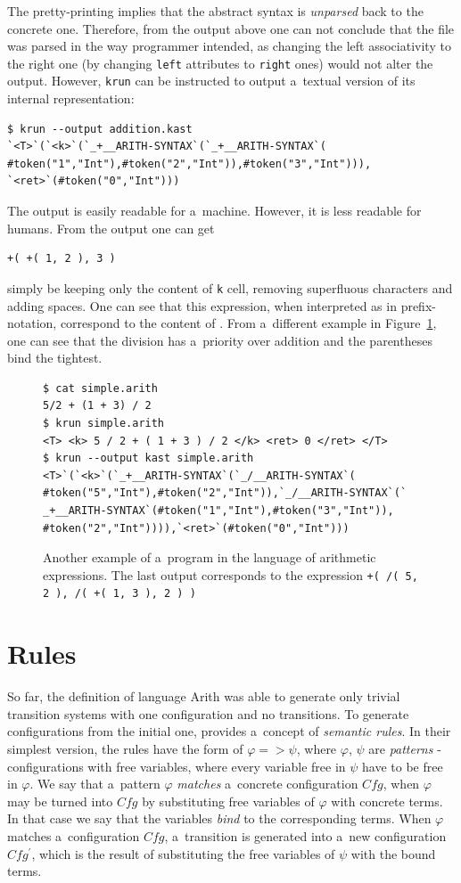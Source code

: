 \documentclass[nolot,nolof,nocover,printed]{fithesis3}
\newcommand{\var}[1]{\mathit{#1}\xspace}
\newcommand{\krun}{\texttt{krun}\xspace}
\begin{document}
The pretty-printing implies that the abstract syntax is \textit{unparsed} back to the concrete one. Therefore, from the output above one can not conclude that the file was parsed in the way programmer intended, as changing the left associativity to the right one (by changing \lstinline|left| attributes to \lstinline|right| ones) would not alter the output. However, \krun can be instructed to output a~textual version of its internal representation:
\begin{lstlisting}
$ krun --output addition.kast
`<T>`(`<k>`(`_+__ARITH-SYNTAX`(`_+__ARITH-SYNTAX`(
#token("1","Int"),#token("2","Int")),#token("3","Int"))),
`<ret>`(#token("0","Int")))
\end{lstlisting}
The output is easily readable for a~machine. However, it is less readable for humans. From the output one can get
\begin{lstlisting}
+( +( 1, 2 ), 3 )
\end{lstlisting}
simply be keeping only the content of \lstinline|k| cell, removing superfluous characters and adding spaces. One can see that this expression, when interpreted as in prefix-notation, correspond to the content of . From a~different example in Figure~\ref{arithMixed}, one can see that the division has a~priority over addition and the parentheses bind the tightest.


\begin{figure}
\begin{lstlisting}
$ cat simple.arith
5/2 + (1 + 3) / 2
$ krun simple.arith
<T> <k> 5 / 2 + ( 1 + 3 ) / 2 </k> <ret> 0 </ret> </T>
$ krun --output kast simple.arith
<T>`(`<k>`(`_+__ARITH-SYNTAX`(`_/__ARITH-SYNTAX`(
#token("5","Int"),#token("2","Int")),`_/__ARITH-SYNTAX`(`
_+__ARITH-SYNTAX`(#token("1","Int"),#token("3","Int")),
#token("2","Int")))),`<ret>`(#token("0","Int")))
\end{lstlisting}
\caption{Another example of a~program in the language of arithmetic expressions. The last output corresponds to the expression \lstinline|+( /( 5, 2 ), /( +( 1, 3 ), 2 ) )|}
\label{arithMixed}
\end{figure}

\section{Rules}
So far, the definition of language Arith was able to generate only trivial transition systems with one configuration and no transitions. To generate configurations from the initial one, \K provides a~concept of \textit{semantic rules}. In their simplest version, the rules have the form of $\varphi => \psi$, where $\varphi$, $\psi$ are \textit{patterns} - configurations with free variables, where every variable free in $\psi$ have to be free in $\varphi$. We say that a~pattern $\varphi$ \textit{matches} a~concrete configuration $\var{Cfg}$, when $\varphi$ may be turned into $\var{Cfg}$ by substituting free variables of $\varphi$ with concrete terms. In that case we say that the variables \textit{bind} to the corresponding terms. When $\varphi$ matches a~configuration $\var{Cfg}$, a~transition is generated into a~new configuration $\var{Cfg^\prime}$, which is the result of substituting the free variables of $\psi$ with the bound terms.
\end{document}
